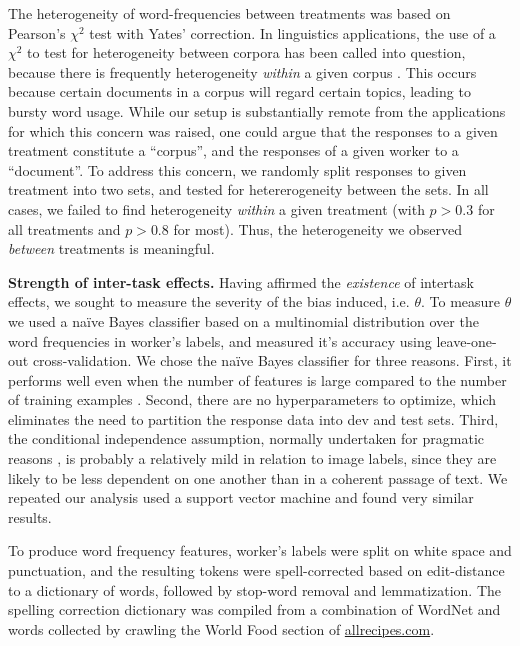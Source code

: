 \documentclass{sigchi}
\begin{document}
The heterogeneity of word-frequencies between treatments was based on 
Pearson's $\chi^2$ test with Yates' correction.
In linguistics applications, the use of a $\chi^2$ to test for 
heterogeneity between corpora has been called
into question, because there is frequently heterogeneity \textit{within}
a given corpus \cite{kilgarriff1996comparing}.
This occurs because certain documents in a corpus will regard certain 
topics, leading to bursty word usage.  While our setup is substantially
remote from the applications for which this concern was raised, 
one could argue that the responses to a given treatment
constitute a ``corpus'', and the responses of a given worker to a 
``document''.
To address this concern, we randomly split responses to given treatment
into two sets, and tested for hetererogeneity between the sets.
In all cases, we failed to find heterogeneity \textit{within} a given 
treatment (with $p > 0.3$ for all treatments and $p > 0.8$ for most).
Thus, the heterogeneity we observed \textit{between} treatments is 
meaningful.

{\bf Strength of inter-task effects.} Having affirmed the \textit{existence} of intertask effects, we sought to
measure the severity of the bias induced, i.e. $\theta$.
To measure $\theta$ we used a na\"ive Bayes classifier based on a 
multinomial distribution over the word frequencies in worker's labels, 
and measured it's accuracy using leave-one-out cross-validation.  
We chose the na\"ive Bayes
classifier for three reasons.  First, it performs well even when the 
number of features is large compared to the number of training examples
\cite{bickel2004,hastie2009elements}.  
Second, there are no hyperparameters to 
optimize, which eliminates the need to partition the response data into
dev and test sets.
Third, the conditional independence assumption, normally 
undertaken for pragmatic reasons \cite{Zhang2004562}, 
is probably a relatively mild in 
relation to image labels, since they are likely to be less dependent
on one another than in a coherent passage of text.  We repeated our
analysis used a support vector machine and found very similar results.

To produce word frequency features, worker's labels were split on white
space and punctuation, and the resulting tokens were spell-corrected based
on edit-distance to a dictionary of words, followed by stop-word removal
and lemmatization.  The spelling correction
dictionary was compiled from a combination of WordNet 
\cite{felbaum1998wordnet} and words
collected by crawling the World Food section of \url{allrecipes.com}.
\end{document}
